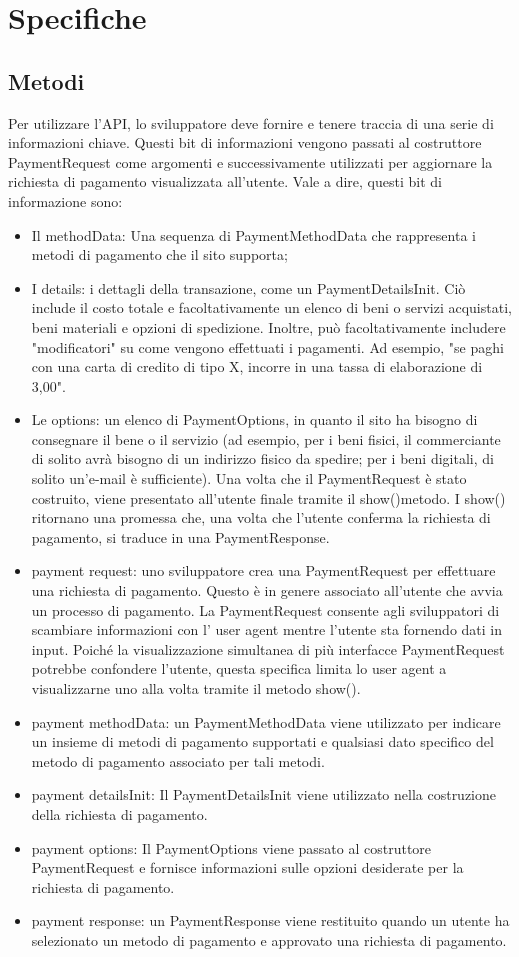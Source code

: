 \documentclass[italian]{article}
\begin{document}
	
	
	\section{Specifiche}
	\subsection{Metodi}
	Per utilizzare l'API, lo sviluppatore deve fornire e tenere traccia di una serie di informazioni chiave. Questi bit di informazioni vengono passati al costruttore PaymentRequest come argomenti e successivamente utilizzati per aggiornare la richiesta di pagamento visualizzata all'utente. Vale a dire, questi bit di informazione sono:
	\begin{itemize}
	\item Il methodData: Una sequenza di PaymentMethodData che rappresenta i metodi di pagamento che il sito supporta;
	\item I details: i dettagli della transazione, come un PaymentDetailsInit. Ciò include il costo totale e facoltativamente un elenco di beni o servizi acquistati, beni materiali e opzioni di spedizione. Inoltre, può facoltativamente includere "modificatori" su come vengono effettuati i pagamenti. Ad esempio, "se paghi con una carta di credito di tipo X, incorre in una tassa di elaborazione di 3,00".
	\item Le options: un elenco di PaymentOptions, in quanto il sito ha bisogno di consegnare il bene o il servizio (ad esempio, per i beni fisici, il commerciante di solito avrà bisogno di un indirizzo fisico da spedire; per i beni digitali, di solito un'e-mail è sufficiente).
	Una volta che il PaymentRequest è stato costruito, viene presentato all'utente finale tramite il show()metodo. I show() ritornano una promessa che, una volta che l'utente conferma la richiesta di pagamento, si traduce in una PaymentResponse.
	\item payment request: uno sviluppatore crea una PaymentRequest per effettuare una richiesta di pagamento. Questo è in genere associato all'utente che avvia un processo di pagamento. La PaymentRequest consente agli sviluppatori di scambiare informazioni con l' user agent mentre l'utente sta fornendo dati in input. Poiché la visualizzazione simultanea di più interfacce PaymentRequest potrebbe confondere l'utente, questa specifica limita lo user agent a visualizzarne uno alla volta tramite il metodo show(). 
	\item payment methodData: un PaymentMethodData viene utilizzato per indicare un insieme di metodi di pagamento supportati e qualsiasi dato specifico del metodo di pagamento associato per tali metodi.
	\item payment detailsInit: Il PaymentDetailsInit viene utilizzato nella costruzione della richiesta di pagamento.
	\item payment options: Il PaymentOptions viene passato al costruttore PaymentRequest e fornisce informazioni sulle opzioni desiderate per la richiesta di pagamento.
	\item payment response: un PaymentResponse viene restituito quando un utente ha selezionato un metodo di pagamento e approvato una richiesta di pagamento.
	\end{itemize}
\end{document}
